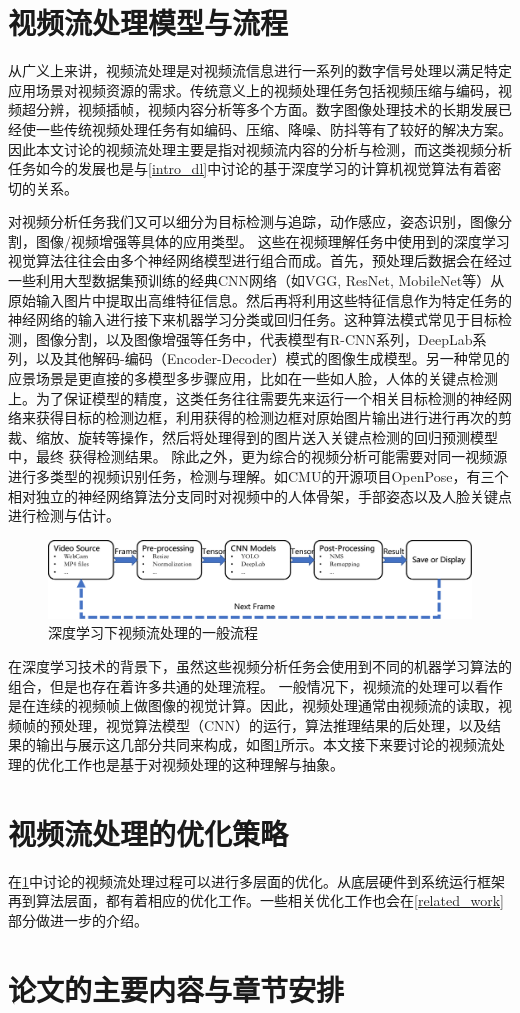 \section{视频流处理模型与流程}\label{intro_vp}
从广义上来讲，视频流处理是对视频流信息进行一系列的数字信号处理以满足特定应用场景对视频资源的需求。传统意义上的视频处理任务包括视频压缩与编码，视频超分辨，视频插帧，视频内容分析等多个方面。数字图像处理技术的长期发展已经使一些传统视频处理任务有如编码、压缩、降噪、防抖等有了较好的解决方案。因此本文讨论的视频流处理主要是指对视频流内容的分析与检测，而这类视频分析任务如今的发展也是与\ref{intro_dl}中讨论的基于深度学习的计算机视觉算法有着密切的关系。\par
对视频分析任务我们又可以细分为目标检测与追踪，动作感应，姿态识别，图像分割，图像/视频增强等具体的应用类型。%
这些在视频理解任务中使用到的深度学习视觉算法往往会由多个神经网络模型进行组合而成。首先，预处理后数据会在经过一些利用大型数据集预训练的经典CNN网络（如VGG, ResNet, MobileNet等）从原始输入图片中提取出高维特征信息。然后再将利用这些特征信息作为特定任务的神经网络的输入进行接下来机器学习分类或回归任务。这种算法模式常见于目标检测，图像分割，以及图像增强等任务中，代表模型有R-CNN系列，DeepLab系列，以及其他解码-编码（Encoder-Decoder）模式的图像生成模型。另一种常见的应景场景是更直接的多模型多步骤应用，比如在一些如人脸，人体的关键点检测上。为了保证模型的精度，这类任务往往需要先来运行一个相关目标检测的神经网络来获得目标的检测边框，利用获得的检测边框对原始图片输出进行进行再次的剪裁、缩放、旋转等操作，然后将处理得到的图片送入关键点检测的回归预测模型中，最终
获得检测结果。%
除此之外，更为综合的视频分析可能需要对同一视频源进行多类型的视频识别任务，检测与理解。如CMU的开源项目OpenPose，有三个相对独立的神经网络算法分支同时对视频中的人体骨架，手部姿态以及人脸关键点进行检测与估计。\par
\begin{figure}[!htp]
    \centering
    \includegraphics[width=\textwidth]{figure/video_proc_flow.pdf}
    \caption{深度学习下视频流处理的一般流程}
    \label{fig:video_proc_flow}
\end{figure}
在深度学习技术的背景下，虽然这些视频分析任务会使用到不同的机器学习算法的组合，但是也存在着许多共通的处理流程。%
一般情况下，视频流的处理可以看作是在连续的视频帧上做图像的视觉计算。因此，视频处理通常由视频流的读取，视频帧的预处理，视觉算法模型（CNN）的运行，算法推理结果的后处理，以及结果的输出与展示这几部分共同来构成，如图\ref{fig:video_proc_flow}所示。本文接下来要讨论的视频流处理的优化工作也是基于对视频处理的这种理解与抽象。\par

\section{视频流处理的优化策略}
在\ref{intro_vp}中讨论的视频流处理过程可以进行多层面的优化。从底层硬件到系统运行框架再到算法层面，都有着相应的优化工作。一些相关优化工作也会在\ref{related_work}部分做进一步的介绍。
\section{论文的主要内容与章节安排}






